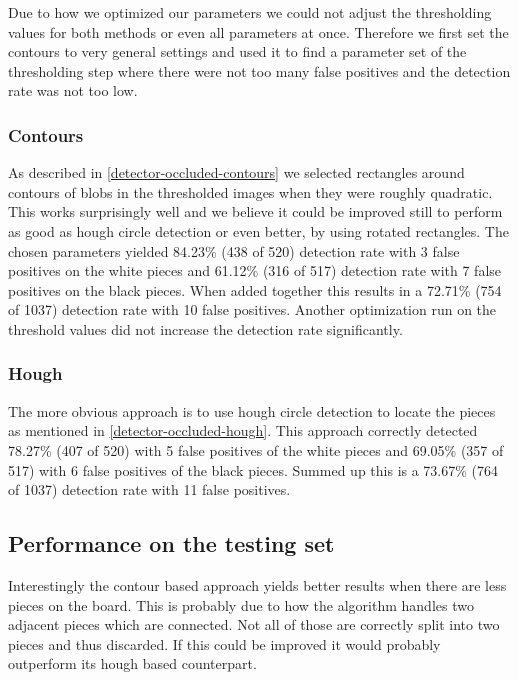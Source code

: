 	Due to how we optimized our parameters we could not adjust the thresholding values for both methods or even all parameters at once. Therefore we first set the contours to very general settings and used it to find a parameter set of the thresholding step where there were not too many false positives and the detection rate was not too low.

	\subsubsection{Contours}
	As described in \autoref{detector-occluded-contours} we selected rectangles around contours of blobs in the thresholded images when they were roughly quadratic. This works surprisingly well and we believe it could be improved still to perform as good as hough circle detection or even better, by using rotated rectangles. The chosen parameters yielded 84.23\% (438 of 520) detection rate with 3 false positives on the white pieces and 61.12\% (316 of 517) detection rate with 7 false positives on the black pieces. When added together this results in a 72.71\% (754 of 1037) detection rate with 10 false positives. Another optimization run on the threshold values did not increase the detection rate significantly.

	\subsubsection{Hough}
	The more obvious approach is to use hough circle detection to locate the pieces as mentioned in \autoref{detector-occluded-hough}. This approach correctly detected 78.27\% (407 of 520) with 5 false positives of the white pieces and 69.05\% (357 of 517) with 6 false positives of the black pieces. Summed up this is a 73.67\% (764 of 1037) detection rate with 11 false positives.

	\subsection{Performance on the testing set}
	
	Interestingly the contour based approach yields better results when there are less pieces on the board. This is probably due to how the algorithm handles two adjacent pieces which are connected. Not all of those are correctly split into two pieces and thus discarded. If this could be improved it would probably outperform its hough based counterpart.

